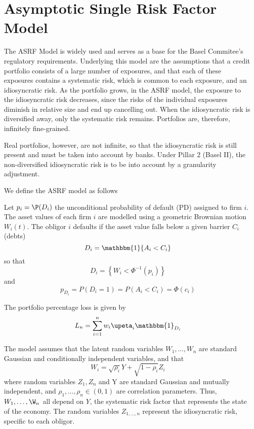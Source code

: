 \section{Asymptotic Single Risk Factor Model}

The ASRF Model is widely used and serves as a base for the Basel Commitee's regulatory requirements.
Underlying this model are the assumptions that a credit portfolio consists of a large number of exposures, and that each of these exposures contains a systematic risk, which is common to each exposure, and an idiosyncratic risk.
As the portfolio grows, in the ASRF model, the exposure to the idiosyncratic risk decreases, since the risks of the individual exposures diminish in relative size and end up cancelling out.
When the idiosyncratic risk is diversified away, only the systematic risk remains.
Portfolios are, therefore, infinitely fine-grained.

Real portfolios, however, are not infinite, so that the idiosyncratic risk is still present and must be taken into account by banks.
Under Pillar 2 (Basel II), the non-diversified idiosyncratic risk is to be into account by a granularity adjustment.


We define the ASRF model as follows

Let
$p_i = \P(D_i)$ the unconditional probability of default (PD) assigned to firm $i$.
The asset values of each firm $i$ are modelled using a geometric Brownian motion $W_i(t)$.
The obligor $i$ defaults if the asset value falls below a given barrier $C_i$ (debts)
\begin{equation}
	D_i = \mathbbm{1}{A_i < C_i}
\end{equation}
so that
\begin{equation}
	D_i = \left\{  W_i < \Phi^{-1}(p_i) \right\}
\end{equation}
and 
\begin{equation}
	p_D_i = P(D_i = 1) = P(A_i < C_i) = \Phi(c_i)
\end{equation}



The portfolio percentage loss is given by
\begin{equation}
	L_n = \sum_{i=1}^{n} w_i \upeta_i \mathbbm{1}_{D_i}
\end{equation}

The model assumes that the latent random variables $W_1,\ldots,W_n$ are standard Gaussian and conditionally independent variables, and that 
\begin{equation}
	W_i = \sqrt{\rho_i} Y + \sqrt{1-\rho_i} Z_i
\end{equation}
where random variables $Z_1, Z_n$ and Y are standard Gaussian and mutually independent, and $\rho_1, \ldots, \rho_n \in (0,1)$ are correlation parameters.
Thus, $W_1, \ldots, \W_n$ all depend on $Y$, the systematic risk factor that represents the state of the economy.
The random variables $Z_{1,\ldots,n}$ represent the idiosyncratic risk, specific to each obligor.

